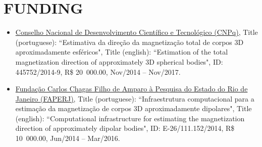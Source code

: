 \documentclass[paper=letter,fontsize=11pt]{scrartcl} %
\newcommand{\sepspace}{\vspace*{1em}}		%
\newcommand{\NewPart}[2]{\section*{\uppercase{#1} #2}}
\newcommand{\FundingEntry}[6]{
        \noindent #1, Title (portuguese): ``#2", Title (english): ``#3", ID: #4, R\$ #5, #6.}
\newcommand{\TalkEntry}[4]{
		\noindent #1, #2, #3 #4}
\begin{document}
\sepspace

\NewPart{Funding}{}

\begin{itemize}

\item\FundingEntry{\href{http://cnpq.br/pagina-inicial}{Conselho Nacional de Desenvolvimento Cient\'{i}fico e Tecnol\'{o}gico (CNPq)}}{Estimativa da dire\c{c}\~{a}o da magnetiza\c{c}\~{a}o total de corpos 3D aproximadamente esf\'{e}ricos}{Estimation of the total magnetization direction of approximately 3D spherical bodies}{445752/2014-9}{20~000.00}{Nov/2014 -- Nov/2017}

\item\FundingEntry{\href{http://www.faperj.br/}{Funda\c{c}\~{a}o Carlos Chagas Filho de Amparo \`{a} Pesquisa do Estado do Rio de Janeiro (FAPERJ)}}{Infraestrutura computacional para a estima\c{c}\~{a}o da magnetiza\c{c}\~{a}o de corpos 3D aproximadamente dipolares}{Computational infrastructure for estimating the magnetization direction of approximately dipolar bodies}{E-26/111.152/2014}{10~000.00}{Jun/2014 -- Mar/2016}

\end{itemize}

\end{document}
